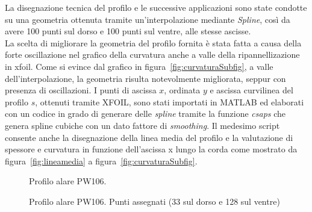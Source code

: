  La disegnazione tecnica del profilo e le successive applicazioni sono state condotte su una geometria ottenuta tramite un'interpolazione mediante {\itshape Spline}, così da avere 100 punti sul dorso e 100 punti sul ventre, alle stesse ascisse. \\ 
La scelta di migliorare la geometria del profilo fornita è stata fatta a causa della forte oscillazione nel grafico della curvatura anche a valle della ripannellizazione in xfoil. Come si evince dal grafico in figura~\ref{fig:curvaturaSubfig}, a valle dell'interpolazione, la geometria risulta notevolmente migliorata, seppur con presenza di oscillazioni. 
I punti di ascissa $x$, ordinata $y$ e ascissa curvilinea del profilo $s$, ottenuti tramite XFOIL, sono stati importati in MATLAB ed elaborati con un codice in grado di generare delle {\itshape spline} tramite la funzione {\itshape csaps} che genera spline cubiche con un dato fattore di {\itshape smoothing}. Il medesimo script consente anche la disegnazione della linea media del profilo e la valutazione di spessore e curvatura in funzione dell’ascissa x lungo la corda come mostrato da figura~\ref{fig:lineamedia} a figura~\ref{fig:curvaturaSubfig}.  \noindent \\


\begin{figure} [H]
	\centering
	\caption{\footnotesize Profilo alare PW106. }\label{fig:puntiprofiloNoGriglia}
\end{figure}

\begin{figure} [h!]
\centering
{}
\caption{\footnotesize Profilo alare PW106. Punti assegnati (33 sul dorso e 128 sul ventre) }\label{fig:puntiprofilo}
\end{figure}

